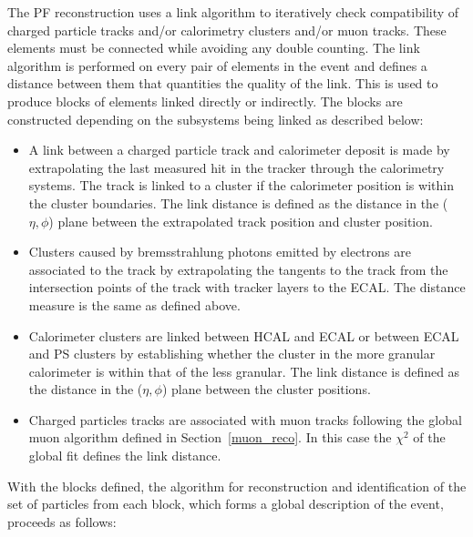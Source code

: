 The PF reconstruction uses a link algorithm to iteratively check compatibility of charged particle tracks 
and/or calorimetry clusters and/or muon tracks. These elements must be connected while avoiding any double counting. 
The link algorithm is performed on every pair of elements in the event and defines a distance between them
that quantities the quality of the link. This is used to produce blocks of elements linked directly 
or indirectly. The blocks are constructed depending on the subsystems being linked as described below:

\begin{itemize}
\item A link between a charged particle track and calorimeter deposit is made by extrapolating the last measured
hit in the tracker through the calorimetry systems. The track is linked to a cluster if the calorimeter position
is within the cluster boundaries. The link distance is defined as the distance in the ($\eta,\phi$) plane between
the extrapolated track position and cluster position.
\item Clusters caused by bremsstrahlung photons emitted by electrons are associated to the track by extrapolating
the tangents to the track from the intersection points of the track with tracker layers to the ECAL. The distance measure
is the same as defined above.
\item Calorimeter clusters are linked between HCAL and ECAL or between ECAL and PS clusters by establishing whether
the cluster in the more granular calorimeter is within that of the less granular. The link distance is defined
as the distance in the ($\eta,\phi$) plane between the cluster positions.
\item Charged particles tracks are associated with muon tracks following the global muon algorithm defined in 
Section~\ref{muon_reco}. In this case the $\chi^2$ of the global fit defines the link distance.
\end{itemize}

With the blocks defined, the algorithm for reconstruction and identification of the set of particles from each
block, which forms a global description of the event, proceeds as follows:

